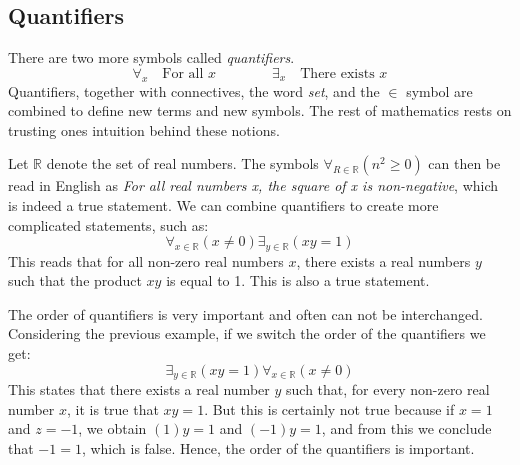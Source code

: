 \subsection{Quantifiers}
    There are two more symbols called
    \textit{\glspl{quantifier}}.
    \begin{equation*}
        \forall_{x}\quad\textrm{For all }x
        \quad\quad\quad\quad
        \exists_{x}\quad\textrm{There exists }x
    \end{equation*}
    Quantifiers, together with connectives, the word \textit{set}, and the
    $\in$ symbol are combined to define new terms and new symbols. The rest
    of mathematics rests on trusting ones intuition behind these notions.
    \begin{example}
        Let $\mathbb{R}$ denote the set of real numbers. The symbols
        $\forall_{R\in\mathbb{R}}(n^{2}\geq{0})$ can then be read in English
        as \textit{For all real numbers x, the square of x is non-negative},
        which is indeed a true statement. We can combine quantifiers to
        create more complicated statements, such as:
        \begin{equation}
            \forall_{x\in\mathbb{R}}(x\ne{0})\exists_{y\in\mathbb{R}}(xy=1)
        \end{equation}
        This reads that for all non-zero real numbers $x$, there exists a
        real numbers $y$ such that the product $xy$ is equal to 1. This is
        also a true statement.
    \end{example}
    \begin{example}
        The order of quantifiers is very important and often can not be
        interchanged. Considering the previous example, if we switch the
        order of the quantifiers we get:
        \begin{equation}
            \exists_{y\in\mathbb{R}}(xy=1)\forall_{x\in\mathbb{R}}(x\ne{0})
        \end{equation}
        This states that there exists a real number $y$ such that, for every
        non-zero real number $x$, it is true that $xy=1$. But this is
        certainly not true because if $x=1$ and $z=\minus{1}$, we obtain
        $(1)y=1$ and $(\minus{1})y=1$, and from this we conclude that
        $\minus{1}=1$, which is false. Hence, the order of the quantifiers
        is important.
    \end{example}
